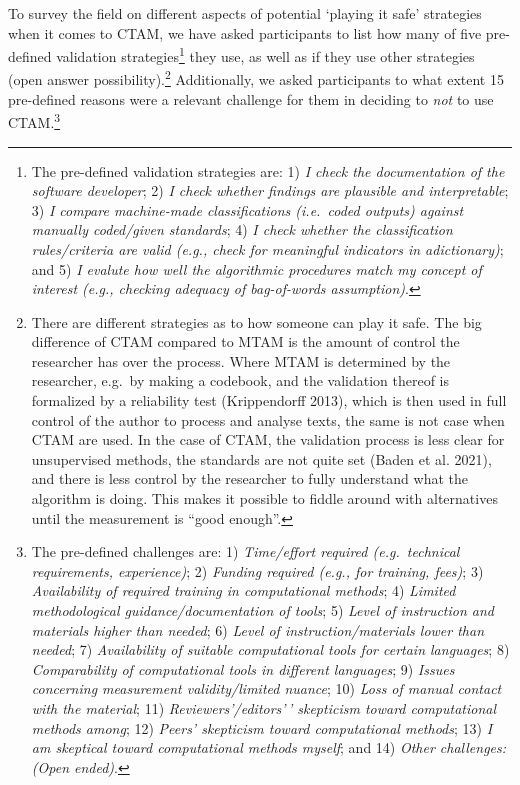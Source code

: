 \documentclass[
]{ccr}
\begin{document}
To survey the field on different aspects of potential `playing it safe'
strategies when it comes to CTAM, we have asked participants to list how
many of five pre-defined validation strategies\footnote{The pre-defined
  validation strategies are: 1) \emph{I check the documentation of the
  software developer}; 2) \emph{I check whether findings are plausible
  and interpretable}; 3) \emph{I compare machine-made classifications
  (i.e.~coded outputs) against manually coded/given standards}; 4)
  \emph{I check whether the classification rules/criteria are valid
  (e.g., check for meaningful indicators in adictionary)}; and 5)
  \emph{I evalute how well the algorithmic procedures match my concept
  of interest (e.g., checking adequacy of bag-of-words assumption)}.}
they use, as well as if they use other strategies (open answer
possibility).\footnote{There are different strategies as to how someone
  can play it safe. The big difference of CTAM compared to MTAM is the
  amount of control the researcher has over the process. Where MTAM is
  determined by the researcher, e.g.~by making a codebook, and the
  validation thereof is formalized by a reliability test (Krippendorff
  2013), which is then used in full control of the author to process and
  analyse texts, the same is not case when CTAM are used. In the case of
  CTAM, the validation process is less clear for unsupervised methods,
  the standards are not quite set (Baden et al. 2021), and there is less
  control by the researcher to fully understand what the algorithm is
  doing. This makes it possible to fiddle around with alternatives until
  the measurement is ``good enough''.} Additionally, we asked
participants to what extent 15 pre-defined reasons were a relevant
challenge for them in deciding to \emph{not} to use CTAM.\footnote{The
  pre-defined challenges are: 1) \emph{Time/effort required
  (e.g.~technical requirements, experience)}; 2) \emph{Funding required
  (e.g., for training, fees)}; 3) \emph{Availability of required
  training in computational methods}; 4) \emph{Limited methodological
  guidance/documentation of tools}; 5) \emph{Level of instruction and
  materials higher than needed}; 6) \emph{Level of instruction/materials
  lower than needed}; 7) \emph{Availability of suitable computational
  tools for certain languages}; 8) \emph{Comparability of computational
  tools in different languages}; 9) \emph{Issues concerning measurement
  validity/limited nuance}; 10) \emph{Loss of manual contact with the
  material}; 11) \emph{Reviewers'/editors'\,' skepticism toward
  computational methods among}; 12) \emph{Peers' skepticism toward
  computational methods}; 13) \emph{I am skeptical toward computational
  methods myself}; and 14) \emph{Other challenges: (Open ended)}.}
\end{document}
